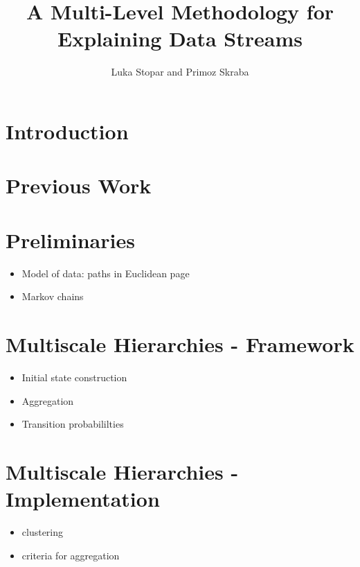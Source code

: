 \documentclass[journal]{vgtc}                %
\title{A Multi-Level Methodology for Explaining Data Streams}
\author{Luka Stopar and Primoz Skraba}
\begin{document}

\maketitle

\section{Introduction}
\label{sec:introduction}





\section{Previous Work}

\section{Preliminaries}

\begin{itemize}
\item Model of data: paths in Euclidean page
\item Markov chains
\end{itemize}

\section{Multiscale Hierarchies - Framework}

\begin{itemize}
\item Initial state construction 
\item Aggregation 
\item Transition probabililties
\end{itemize}


\section{Multiscale Hierarchies - Implementation}

\begin{itemize}
\item clustering
\item criteria for aggregation 
\end{itemize}
\end{document}
